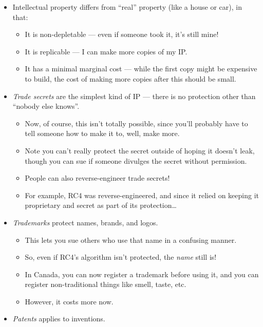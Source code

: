 \documentclass{article}
\begin{document}
\begin{itemize}
    \item Intellectual property differs from ``real'' property (like a house or car), in that:
        \begin{itemize}
            \item It is non-depletable --- even if someone took it, it's still mine!
            \item It is replicable --- I can make more copies of my IP.
            \item It has a minimal marginal cost --- while the first copy might be expensive to build, the cost of making more copies after this should be small.
        \end{itemize}
    \item \emph{Trade secrets} are the simplest kind of IP --- there is no protection other than ``nobody else knows''.
        \begin{itemize}
            \item Now, of course, this isn't totally possible, since you'll probably have to tell someone how to make it to, well, make more.
            \item Note you can't really protect the secret outside of hoping it doesn't leak, though you can sue if someone divulges the secret without permission.
            \item People can also reverse-engineer trade secrets!
            \item For example, RC4 was reverse-engineered, and since it relied on keeping it proprietary and secret as part of its protection\dots
        \end{itemize}
    \item \emph{Trademarks} protect names, brands, and logos.
        \begin{itemize}
            \item This lets you sue others who use that name in a confusing manner.
            \item So, even if RC4's algorithm isn't protected, the \emph{name} still is!
            \item In Canada, you can now register a trademark before using it, and you can register non-traditional things like smell, taste, etc.
            \item However, it costs more now.
        \end{itemize}
    \item \emph{Patents} applies to inventions.
        \begin{itemize}

\end{itemize}
\end{itemize}
\end{document}
